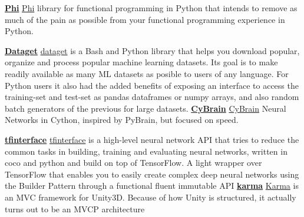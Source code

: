 \begin{cventries}
  \cventry
    {\href{https://github.com/cgarciae/phi}{\textbf{Phi}}}
    {}
    {}
    {}
    {
      \href{https://github.com/cgarciae/phi}{Phi} library for functional programming in Python that intends to remove as much of the pain as possible from your functional programming experience in Python.
    }

  \cventry
    {\href{https://github.com/cgarciae/dataget}{\textbf{Dataget}}}
    {}
    {}
    {}
    {
    \href{https://github.com/cgarciae/dataget}{dataget}  is a Bash and Python library that helps you download popular, organize and process popular machine learning datasets. Its goal is to make readily available as many ML datasets as posible to users of any language. For Python users it also had the added benefits of exposing an interface to access the training-set and test-set as pandas dataframes or numpy arrays, and also random batch generators of the previous for large datasets.
    }
  \cventry
    {\href{https://github.com/cgarciae/cybrain}{\textbf{CyBrain}}}
    {}
    {}
    {}
    {
    \href{https://github.com/cgarciae/cybrain}{CyBrain} Neural Networks in Cython, inspired by PyBrain, but focused on speed.
    } 

  \cventry
    {\href{https://github.com/cgarciae/tfinterface}{\textbf{tfinterface}}}
    {}
    {}
    {}
    {
    \href{https://github.com/cgarciae/tfinterface}{tfinterface} is a high-level neural network API that tries to reduce the common tasks in building, training and evaluating neural networks, written in coco and python and build on top of TensorFlow. A light wrapper over TensorFlow that enables you to easily create complex deep neural networks using the Builder Pattern through a functional fluent immutable API
    } 
  \cventry
    {\href{https://github.com/cgarciae/karma}{\textbf{karma}}}
    {}
    {}
    {}
    {
    \href{https://github.com/cgarciae/karma}{Karma} is an MVC framework for Unity3D. Because of how Unity is structured, it actually turns out to be an MVCP architecture 
    } 
\end{cventries}
